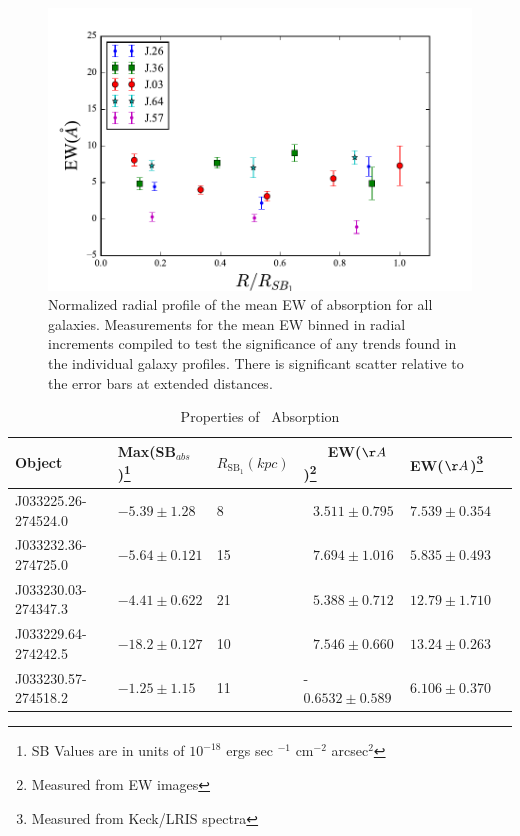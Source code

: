 \documentclass[twocolumn]{aastex61}
\begin{document}
\begin{figure}[!htb]
\centering
\includegraphics[scale=0.9]{../Figures/ew_comb.pdf}
\caption{Normalized radial profile of the mean EW of  absorption for all galaxies. Measurements for the mean EW binned in radial increments compiled to test the significance of any trends found in the individual galaxy profiles. There is significant scatter relative to the error bars at extended distances.}
\label{fig:ew_comb}
\end{figure}

\begin{table}[]
\centering
\caption{Properties of \ Absorption\label{tab:abs_props}}  
\begin{tabular}{llllll} \hline \hline
Object & Max(SB$_{abs}$)\footnote{SB Values are in units of $10^{-18}$ ergs sec $^{-1}$ cm$^{-2}$ arcsec$^2$} & $R_{\text{SB}_1}(kpc)$ &\ \ \ EW($\AA$)\footnote{ Measured from EW images} & EW($\AA$)\footnote{Measured from Keck/LRIS spectra}  \\  \hline
J033225.26-274524.0 &  $-5.39 \pm 1.28 $ & 8 &     $\ \ \ 3.511 \pm 0.795$ & $7.539 \pm 0.354 $\\
J033232.36-274725.0 &  $-5.64 \pm 0.121 $ & 15 & $\ \ \ 7.694 \pm 1.016$ & $5.835 \pm 0.493$\\
J033230.03-274347.3 &  $-4.41 \pm 0.622 $ & 21 & $\ \ \ 5.388 \pm 0.712$ & $12.79 \pm 1.710$\\
J033229.64-274242.5 &  $-18.2 \pm 0.127 $ & 10 & $\ \ \ 7.546 \pm 0.660$ & $13.24 \pm 0.263$\\
J033230.57-274518.2 &  $-1.25 \pm 1.15   $ & 11& -$0.6532 \pm 0.589$ & $6.106 \pm 0.370$\\ \hline
\end{tabular}
\end{table}
 
\end{document}
